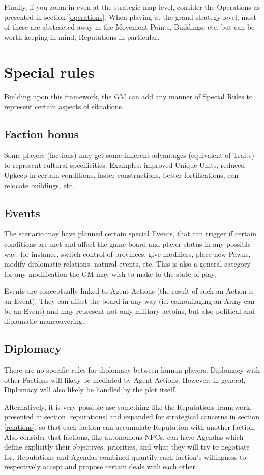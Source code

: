 Finally, if you zoom in even at the strategic map level, consider the Operations as presented in section \ref{operations}. When playing at the grand strategy level, most of these are abstracted away in the Movement Points, Buildings, etc. but can be worth keeping in mind, Reputations in particular.


\section{Special rules}

Building upon this framework, the GM can add any manner of Special Rules to represent certain aspects of situations.


\subsection{Faction bonus}

Some players (factions) may get some inherent advantages (equivalent of Traits) to represent cultural specificities. Examples: improved Unique Units, reduced Upkeep in certain conditions, faster constructions, better fortifications, can relocate buildings, etc.

\subsection{Events}

The scenario may have planned certain special Events, that can trigger if certain conditions are met and affect the game board and player status in any possible way: for instance, switch control of provinces, give modifiers, place new Pawns, modify diplomatic relations, natural events, etc. This is also a general category for any modification the GM may wish to make to the state of play.

Events are conceptually linked to Agent Actions (the result of such an Action is an Event). They can affect the board in any way (ie. camouflaging an Army can be an Event) and may represent not only military actoins, but also political and diplomatic maneouvering.

\subsection{Diplomacy}

There are no specific rules for diplomacy between human players. Diplomacy with other Factions will likely be mediated by Agent Actions. However, in general, Diplomacy will also likely be handled by the plot itself. 

Alternatively, it is very possible use something like the Reputations framework, presented in section \ref{reputations} and expanded for strategical concerns in section \ref{relations}: so that each faction can accumulate Reputation with another faction. Also consider that factions, like autonomous NPCs, can have Agendas which define explicitly their objectives, priorities, and what they will try to negotiate for. Reputations and Agendas combined quantify each faction's willingness to respectively accept and propose certain deals with each other.
